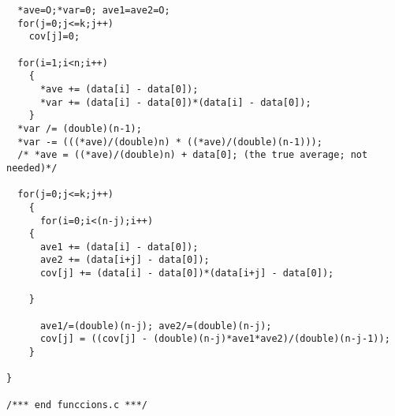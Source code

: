\documentclass[12pt,letterpaper]{report}
\theoremstyle{plain}
\theoremstyle{definition}
\theoremstyle{remark}
\numberwithin{theorem}{chapter}
\numberwithin{claim}{chapter}
\numberwithin{equation}{chapter}
\numberwithin{conjecture}{chapter}
\newcommand\<{\ensuremath{\langle}}
\renewcommand\>{\ensuremath{\rangle}}
\begin{document}
{\begin{verbatim}
  *ave=O;*var=0; ave1=ave2=O;
  for(j=0;j<=k;j++)
    cov[j]=0;

  for(i=1;i<n;i++)
    {
      *ave += (data[i] - data[0]);
      *var += (data[i] - data[0])*(data[i] - data[0]);
    }
  *var /= (double)(n-1);
  *var -= (((*ave)/(double)n) * ((*ave)/(double)(n-1)));
  /* *ave = ((*ave)/(double)n) + data[0]; (the true average; not needed)*/

  for(j=0;j<=k;j++)
    {
      for(i=0;i<(n-j);i++)
	{
	  ave1 += (data[i] - data[0]);
	  ave2 += (data[i+j] - data[0]);
	  cov[j] += (data[i] - data[0])*(data[i+j] - data[0]);

	}

      ave1/=(double)(n-j); ave2/=(double)(n-j);
      cov[j] = ((cov[j] - (double)(n-j)*ave1*ave2)/(double)(n-j-1));
    }

}

/*** end funccions.c ***/

\end{verbatim}
}





%
%
\end{document}
